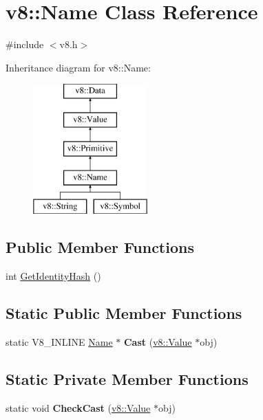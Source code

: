 \hypertarget{classv8_1_1_name}{}\section{v8\+:\+:Name Class Reference}
\label{classv8_1_1_name}


{\ttfamily \#include $<$v8.\+h$>$}

Inheritance diagram for v8\+:\+:Name\+:\begin{figure}[H]
\begin{center}
\leavevmode
\includegraphics[height=5.000000cm]{classv8_1_1_name}
\end{center}
\end{figure}
\subsection*{Public Member Functions}
\begin{DoxyCompactItemize}
\item 
int \hyperlink{classv8_1_1_name_aef60fce47685fad12914304f6bc52bf2}{Get\+Identity\+Hash} ()
\end{DoxyCompactItemize}
\subsection*{Static Public Member Functions}
\begin{DoxyCompactItemize}
\item 
static V8\+\_\+\+I\+N\+L\+I\+NE \hyperlink{classv8_1_1_name}{Name} $\ast$ {\bfseries Cast} (\hyperlink{classv8_1_1_value}{v8\+::\+Value} $\ast$obj)\hypertarget{classv8_1_1_name_a8291aa8958f5dfb67d4415510f584ac4}{}\label{classv8_1_1_name_a8291aa8958f5dfb67d4415510f584ac4}

\end{DoxyCompactItemize}
\subsection*{Static Private Member Functions}
\begin{DoxyCompactItemize}
\item 
static void {\bfseries Check\+Cast} (\hyperlink{classv8_1_1_value}{v8\+::\+Value} $\ast$obj)\hypertarget{classv8_1_1_name_a3a7c1f5bba2fb9dcd6c60a8948f0f000}{}\label{classv8_1_1_name_a3a7c1f5bba2fb9dcd6c60a8948f0f000}

\end{DoxyCompactItemize}


